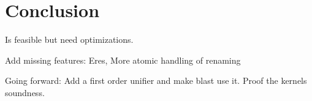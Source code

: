 \chapter{Conclusion}\label{chapter:conclusion}

Is feasible but need optimizations.

Add missing features: Eres, More atomic handling of renaming

Going forward: Add a first order unifier and make blast use it. Proof the kernels soundness.
